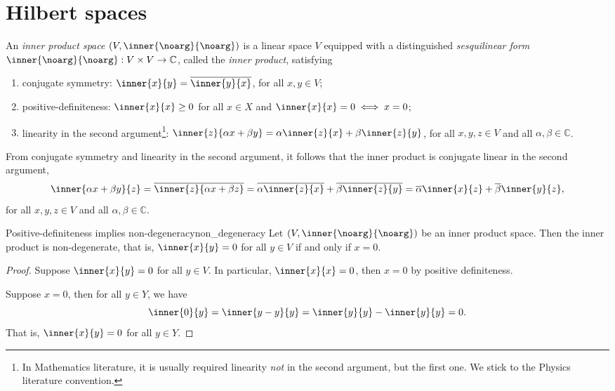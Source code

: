 \chapter{Hilbert spaces}
An \emph{inner product space} \((V, \inner{\noarg}{\noarg})\) is a linear space \(V\) equipped with a distinguished \emph{sesquilinear form} \(\inner{\noarg}{\noarg} : V \times V \to \mathbb{C}\), called the \emph{inner product}, satisfying
\begin{enumerate}[label=(\alph*)]
    \item conjugate symmetry: \(\inner{x}{y} = \conj{\inner{y}{x}}\), for all \(x, y \in V\);
    \item positive-definiteness: \(\inner{x}{x} \geq 0\) for all \(x \in X\) and \(\inner{x}{x} = 0 \iff x = 0\);
    \item linearity in the second argument\footnote{In Mathematics literature, it is usually required linearity \emph{not} in the second argument, but the first one. We stick to the Physics literature convention.}: \(\inner{z}{\alpha x + \beta y} = \alpha \inner{z}{x} + \beta \inner{z}{y}\), for all \(x, y, z \in V\) and all \(\alpha, \beta \in \mathbb{C}\).
\end{enumerate}
From conjugate symmetry and linearity in the second argument, it follows that the inner product is conjugate linear in the second argument,
\begin{equation*}
    \inner{\alpha x + \beta y}{z} = \conj{\inner{z}{\alpha x + \beta z}} = \conj{\alpha\inner{z}{x}} + \conj{\beta\inner{z}{y}} = \conj{\alpha} \inner{x}{z} + \conj{\beta} \inner{y}{z},
\end{equation*}
for all \(x,y,z \in V\) and all \(\alpha, \beta \in \mathbb{C}\).

\begin{proposition}{Positive-definiteness implies non-degeneracy}{non_degeneracy}
    Let \((V, \inner{\noarg}{\noarg})\) be an inner product space. Then the inner product is non-degenerate, that is, \(\inner{x}{y} = 0\) for all \(y \in V\) if and only if \(x = 0\).
\end{proposition}
\begin{proof}
    Suppose \(\inner{x}{y} = 0\) for all \(y \in V\). In particular, \(\inner{x}{x} = 0\), then \(x = 0\) by positive definiteness.

    Suppose \(x = 0\), then for all \(y \in Y\), we have
    \begin{equation*}
        \inner{0}{y} = \inner{y-y}{y} = \inner{y}{y} - \inner{y}{y} = 0.
    \end{equation*}
    That is, \(\inner{x}{y} = 0\) for all \(y \in Y\).
\end{proof}

